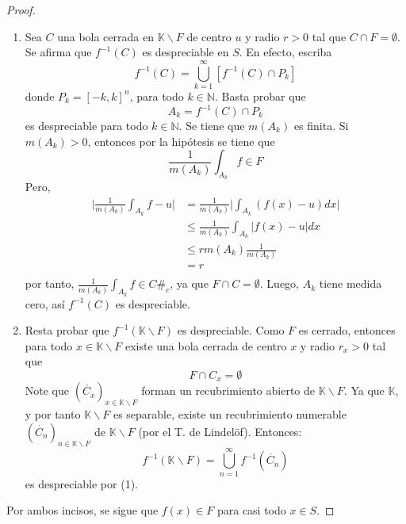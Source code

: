 \documentclass[12pt]{report}
\theoremstyle{largebreak}
\newcommand\contradiction{\ensuremath{\#_c}}
\newcommand\abs[1]{\ensuremath{\big|#1\big|}}
\begin{document}
    \begin{proof}
        \begin{enumerate}
            \item Sea $C$ una bola cerrada en $\mathbb{K}\backslash F$ de centro $u$ y radio $r>0$ tal que $C\cap F=\emptyset$. Se afirma que $f^{-1}(C)$ es despreciable en $S$. En efecto, escriba
            \begin{equation*}
                f^{-1}(C)=\bigcup_{ k=1}^\infty\left[f^{-1}(C)\cap P_k \right]
            \end{equation*}
            donde $P_k=\left[-k,k\right]^n$, para todo $k\in\mathbb{N}$. Basta probar que
            \begin{equation*}
                A_k=f^{-1}(C)\cap P_k
            \end{equation*}
            es despreciable para todo $k\in\mathbb{N}$. Se tiene que $m(A_k)$ es finita. Si $m(A_k)>0$, entonces por la hipótesis se tiene que
            \begin{equation*}
                \frac{1}{m(A_k)}\int_{A_k}f\in F
            \end{equation*}
            Pero,
            \begin{equation*}
                \begin{split}
                    \abs{\frac{1}{m(A_k)}\int_{A_k}f-u}&=\frac{1}{m(A_k)}\abs{\int_{A_k}(f(x)-u)dx}\\
                    &\leq \frac{1}{m(A_k)}\int_{A_k}\abs{f(x)-u}dx\\
                    &\leq r m(A_k)\frac{1}{m(A_k)}\\
                    &=r\\
                \end{split}
            \end{equation*}
            por tanto, $\frac{1}{m(A_k)}\int_{A_k}f\in C$\contradiction, ya que $F\cap C=\emptyset$. Luego, $A_k$ tiene medida cero, así $f^{-1}(C)$ es despreciable.

            \item Resta probar que $f^{-1}(\mathbb{K}\backslash F)$ es despreciable. Como $F$ es cerrado, entonces para todo $x\in\mathbb{K}\backslash F$ existe una bola cerrada de centro $x$ y radio $r_x>0$ tal que
            \begin{equation*}
                F\cap C_x=\emptyset
            \end{equation*}
            Note que $\left(\mathring{C_x} \right)_{ x\in\mathbb{K}\backslash F}$ forman un recubrimiento abierto de $\mathbb{K}\backslash F$. Ya que $\mathbb{K}$, y por tanto $\mathbb{K}\backslash F$ es separable, existe un recubrimiento numerable $\left(\mathring{C_n} \right)_{ n\in\mathbb{K}\backslash F}$ de $\mathbb{K}\backslash F$ (por el T. de Lindelöf). Entonces:
            \begin{equation*}
                f^{-1}(\mathbb{K}\backslash F)=\bigcup_{ n=1}^\infty f^{-1}(\mathring{C_n})
            \end{equation*}
            es despreciable por (1).
        \end{enumerate}
        Por ambos incisos, se sigue que $f(x)\in F$ para casi todo $x\in S$.
    \end{proof}
\end{document}
